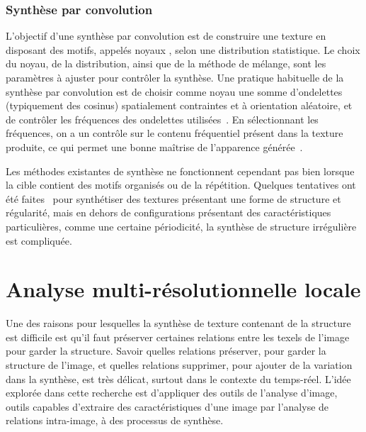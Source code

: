 \subsubsection{Synthèse par convolution}

L'objectif d'une synthèse par convolution est de construire une texture en disposant des motifs, appelés \og noyaux \fg, selon une distribution statistique. Le choix du noyau, de la distribution, ainsi que de la méthode de mélange, sont les paramètres à ajuster pour contrôler la synthèse. Une pratique habituelle de la synthèse par convolution est de choisir comme noyau une somme d'ondelettes (typiquement des cosinus) spatialement contraintes et à orientation aléatoire, et de contrôler les fréquences des ondelettes utilisées~\cite{tricard_procedural_2019}. En sélectionnant les fréquences, on a un contrôle sur le contenu fréquentiel présent dans la texture produite, ce qui permet une bonne maîtrise de l'apparence générée~\cite{gilet_local_2014}.

\bigskip

Les méthodes existantes de synthèse ne fonctionnent cependant pas bien lorsque la cible contient des motifs organisés ou de la répétition. Quelques tentatives ont été faites~\cite{lutz_cyclostationary-gaussian_2021} pour synthétiser des textures présentant une forme de structure et régularité, mais en dehors de configurations présentant des caractéristiques particulières, comme une certaine périodicité, la synthèse de structure irrégulière est compliquée.



\section{Analyse multi-résolutionnelle locale}

Une des raisons pour lesquelles la synthèse de texture contenant de la structure est difficile est qu'il faut préserver certaines relations entre les texels de l'image pour garder la structure. Savoir quelles relations préserver, pour garder la structure de l'image, et quelles relations supprimer, pour ajouter de la variation dans la synthèse, est très délicat, surtout dans le contexte du temps-réel. L'idée explorée dans cette recherche est d'appliquer des outils de l'analyse d'image, outils capables d'extraire des caractéristiques d'une image par l'analyse de relations intra-image, à des processus de synthèse.

